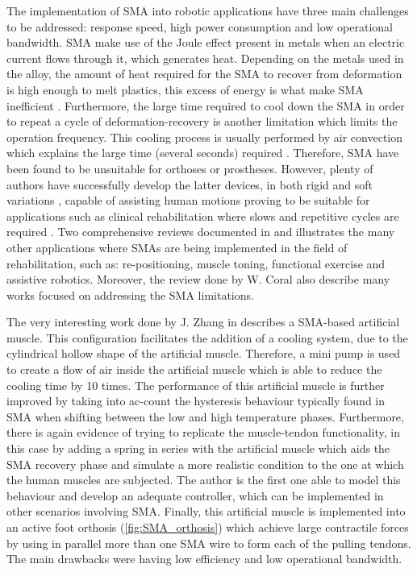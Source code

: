 The implementation of SMA into robotic applications have three main challenges to be addressed: response speed, high power consumption and low operational bandwidth. SMA make use of the Joule effect present in metals when an electric current flows through it, which generates heat. Depending on the metals used in the alloy, the amount of heat required for the SMA to recover from deformation is high enough to melt plastics, this excess of energy is what make SMA inefficient \cite{Bundhoo2009a}. Furthermore, the large time required to cool down the SMA in order to repeat a cycle of deformation-recovery is another limitation which limits the operation frequency. This cooling process is usually performed by air convection which explains the large time (several seconds) required \cite{Bundhoo2009}. Therefore, SMA have been found to be unsuitable for orthoses or prostheses. However, plenty of authors have successfully develop the latter devices, in both rigid \cite{tarkesh2007} and soft variations \cite{Stirling2011}, capable of assisting human motions proving to be suitable for applications such as clinical rehabilitation where slows and repetitive cycles are required \cite{Pittaccio2009,Chenal2014}. Two comprehensive reviews documented in \cite{pittaccio2012shape} and \cite{Coral2012} illustrates the many other applications where SMAs are being implemented in the field of rehabilitation, such as: re-positioning, muscle toning, functional exercise and assistive robotics. Moreover, the review done by W. Coral also describe many works focused on addressing the SMA limitations.

The very interesting work done by J. Zhang in \cite{Zhang2013a} describes a SMA-based artificial muscle. This configuration facilitates the addition of a cooling system, due to the cylindrical hollow shape of the artificial muscle. Therefore, a mini pump is used to create a flow of air inside the artificial muscle which is able to reduce the cooling time by 10 times. The performance of this artificial muscle is further improved by taking into ac-count the hysteresis behaviour typically found in SMA when shifting between the low and high temperature phases. Furthermore, there is again evidence of trying to replicate the muscle-tendon functionality, in this case by adding a spring in series with the artificial muscle which aids the SMA recovery phase and simulate a more realistic condition to the one at which the human muscles are subjected. The author is the first one able to model this behaviour and develop an adequate controller, which can be implemented in other scenarios involving SMA. Finally, this artificial muscle is implemented into an active foot orthosis (\autoref{fig:SMA_orthosis}) which achieve large contractile forces by using in parallel more than one SMA wire to form each of the pulling tendons. The main drawbacks were having low efficiency and low operational bandwidth.

